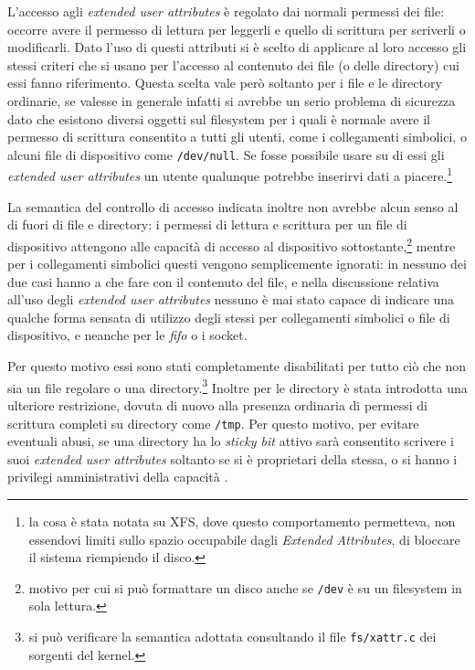 \begin{basedescript}{\desclabelwidth{1.7cm}\desclabelstyle{\nextlinelabel}}
\item[\texttt{user}] L'accesso agli \textit{extended user attributes} è
  regolato dai normali permessi dei file: occorre avere il permesso di lettura
  per leggerli e quello di scrittura per scriverli o modificarli. Dato l'uso
  di questi attributi si è scelto di applicare al loro accesso gli stessi
  criteri che si usano per l'accesso al contenuto dei file (o delle directory)
  cui essi fanno riferimento. Questa scelta vale però soltanto per i file e le
  directory ordinarie, se valesse in generale infatti si avrebbe un serio
  problema di sicurezza dato che esistono diversi oggetti sul filesystem per i
  quali è normale avere il permesso di scrittura consentito a tutti gli
  utenti, come i collegamenti simbolici, o alcuni file di dispositivo come
  \texttt{/dev/null}. Se fosse possibile usare su di essi gli \textit{extended
    user attributes} un utente qualunque potrebbe inserirvi dati a
  piacere.\footnote{la cosa è stata notata su XFS, dove questo comportamento
    permetteva, non essendovi limiti sullo spazio occupabile dagli
    \textit{Extended Attributes}, di bloccare il sistema riempiendo il disco.}

  La semantica del controllo di accesso indicata inoltre non avrebbe alcun
  senso al di fuori di file e directory: i permessi di lettura e scrittura per
  un file di dispositivo attengono alle capacità di accesso al dispositivo
  sottostante,\footnote{motivo per cui si può formattare un disco anche se
    \texttt{/dev} è su un filesystem in sola lettura.} mentre per i
  collegamenti simbolici questi vengono semplicemente ignorati: in nessuno dei
  due casi hanno a che fare con il contenuto del file, e nella discussione
  relativa all'uso degli \textit{extended user attributes} nessuno è mai stato
  capace di indicare una qualche forma sensata di utilizzo degli stessi per
  collegamenti simbolici o file di dispositivo, e neanche per le \textit{fifo}
  o i socket.

  Per questo motivo essi sono stati completamente disabilitati per tutto ciò
  che non sia un file regolare o una directory.\footnote{si può verificare la
    semantica adottata consultando il file \texttt{fs/xattr.c} dei sorgenti
    del kernel.} Inoltre per le directory è stata introdotta una ulteriore
  restrizione, dovuta di nuovo alla presenza ordinaria di permessi di
  scrittura completi su directory come \texttt{/tmp}. Per questo motivo, per
  evitare eventuali abusi, se una directory ha lo \textit{sticky bit} attivo
  sarà consentito scrivere i suoi \textit{extended user attributes} soltanto
  se si è proprietari della stessa, o si hanno i privilegi amministrativi
  della capacità .
\end{basedescript}

